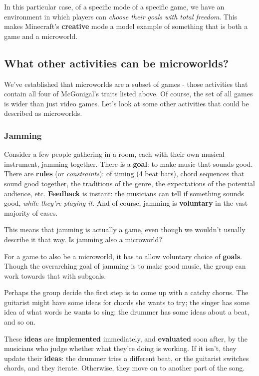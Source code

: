 In this particular case, of a specific mode of a specific game, we have
an environment in which players can \emph{choose their goals with total
freedom}. This makes Minecraft's \textbf{creative} mode a model example
of something that is both a game and a microworld.

\subsection{What other activities can be microworlds?}

We've established that microworlds are a subset of games - those
activities that contain all four of McGonigal's traits listed above. Of
course, the set of all games is wider than just video games. Let's look
at some other activities that could be described as microworlds.

\subsubsection{Jamming}

Consider a few people gathering in a room, each with their own musical
instrument, jamming together. There is a \textbf{goal}: to make music
that sounds good. There are \textbf{rules} (or \emph{constraints}): of
timing (4 beat bars), chord sequences that sound good together, the
traditions of the genre, the expectations of the potential audience,
etc. \textbf{Feedback} is instant: the musicians can tell if something
sounds good, \emph{while they're playing it}. And of course, jamming is
\textbf{voluntary} in the vast majority of cases.

This means that jamming is actually a game, even though we wouldn't
usually describe it that way. Is jamming also a microworld?

For a game to also be a microworld, it has to allow voluntary choice of
\textbf{goals}. Though the overarching goal of jamming is to make good
music, the group can work towards that with subgoals.

Perhaps the group decide the first step is to come up with a catchy
chorus. The guitarist might have some ideas for chords she wants to try;
the singer has some idea of what words he wants to sing; the drummer has
some ideas about a beat, and so on.

These \textbf{ideas} are \textbf{implemented} immediately, and
\textbf{evaluated} soon after, by the musicians who judge whether what
they're doing is working. If it isn't, they update their \textbf{ideas}:
the drummer tries a different beat, or the guitarist switches chords,
and they iterate. Otherwise, they move on to another part of the song.

